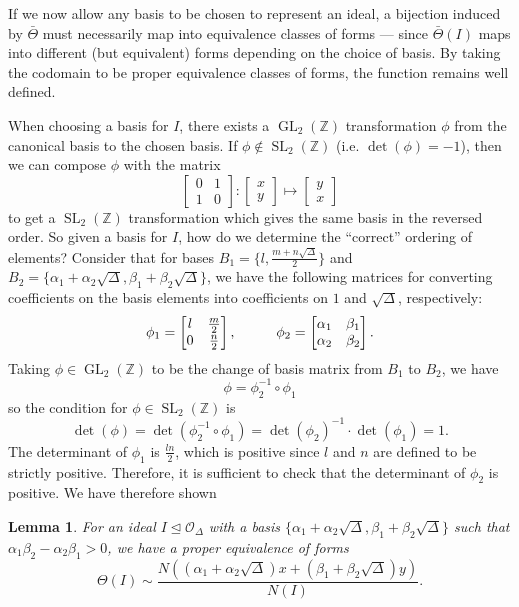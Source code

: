 \documentclass[honours,12pt]{unswthesis}
\newcommand{\Z}{\mathbb{Z}} %
\newcommand{\order}{\mathcal{O}} %
\DeclareMathOperator{\GL}{GL}
\DeclareMathOperator{\SL}{SL}
\newcommand{\bmat}[1]{\begin{bmatrix}#1\end{bmatrix}}
\newtheorem{lemma}[theorem]{Lemma}
\numberwithin{equation}{section}
\begin{document}
If we now allow any basis to be chosen to represent an ideal, a bijection induced by $\bar{\Theta}$ must necessarily map into equivalence classes of forms ---
since $\bar{\Theta}(I)$ maps into different (but equivalent) forms depending on the choice of basis.
By taking the codomain to be proper equivalence classes of forms, the function remains well defined.

When choosing a basis for $I$, there exists a $\GL_2(\Z)$ transformation $\phi$ from the canonical basis to the chosen basis.
If $\phi \notin \SL_2(\Z)$ (i.e. $\det(\phi) = -1$), then we can compose $\phi$ with the matrix 
$$\bmat{0 & 1 \\ 1 & 0} : \bmat{x \\ y} \longmapsto \bmat{y \\ x}$$
to get a $\SL_2(\Z)$ transformation which gives the same basis in the reversed order.
So given a basis for $I$, how do we determine the ``correct'' ordering of elements?
Consider that for bases $B_1 = \{ l, \frac{m + n\sqrt\Delta}{2} \}$ and $B_2 = \{ \alpha_1 + \alpha_2 \sqrt\Delta , \beta_1 + \beta_2 \sqrt\Delta \}$, 
we have the following matrices for converting coefficients on the basis elements into coefficients on $1$ and $\sqrt\Delta$, respectively:
$$\phi_1 = \bmat{l & \frac{m}{2} \\ 0 & \frac{n}{2}}, 
\hspace{10mm} 
\phi_2 = \bmat{\alpha_1 & \beta_1 \\ \alpha_2 & \beta_2}.$$
Taking $\phi \in \GL_2(\Z)$ to be the change of basis matrix from $B_1$ to $B_2$, we have
$$\phi = \phi_2^{-1} \circ \phi_1$$
so the condition for $\phi \in \SL_2(\Z)$ is
$$\det \left( \phi \right) = \det \left( \phi_2^{-1} \circ \phi_1 \right) = \det \left( \phi_2 \right)^{-1} \cdot \det \left( \phi_1 \right) = 1.$$
The determinant of $\phi_1$ is $\frac{ln}{2}$, which is positive since $l$ and $n$ are defined to be strictly positive.
Therefore, it is sufficient to check that the determinant of $\phi_2$ is positive.
We have therefore shown

\vspace{2mm}
\begin{lemma} \label{lemma-basis-orientation}
    For an ideal $I \trianglelefteq \order_\Delta$ with a basis $\{ \alpha_1 + \alpha_2 \sqrt\Delta , \beta_1 + \beta_2 \sqrt\Delta \}$ such that $\alpha_1 \beta_2 - \alpha_2 \beta_1 > 0$, we have a proper equivalence of forms
    $$\Theta(I) \sim \frac{N \left( (\alpha_1 + \alpha_2 \sqrt\Delta)x + (\beta_1 + \beta_2 \sqrt\Delta)y \right) }{N(I)}.$$
\end{lemma}
\vspace{2mm}
\end{document}
